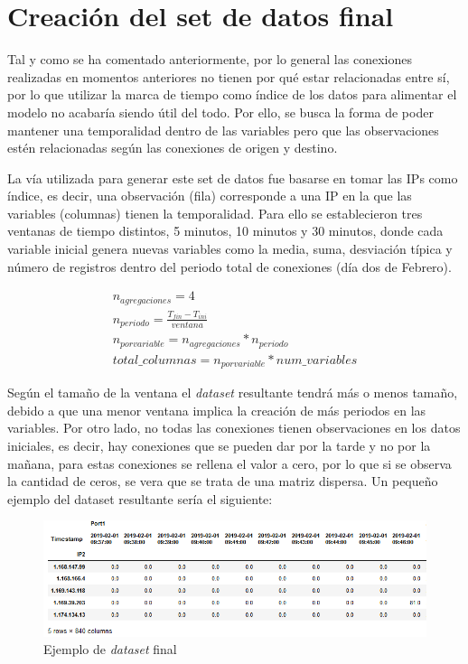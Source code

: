 \section{Creación del set de datos final}

Tal y como se ha comentado anteriormente, por lo general las conexiones realizadas en momentos anteriores no tienen por qué estar relacionadas entre sí, por lo que utilizar la marca de tiempo como índice de los datos para alimentar el modelo no acabaría siendo útil del todo. Por ello, se busca la forma de poder mantener una temporalidad dentro de las variables pero que las observaciones estén relacionadas según las conexiones de origen y destino.

La vía utilizada para generar este set de datos fue basarse en tomar las IPs como índice, es decir, una observación (fila) corresponde a una IP en la que las variables (columnas) tienen la temporalidad. Para ello se establecieron tres ventanas de tiempo distintos, 5 minutos, 10 minutos y 30 minutos, donde cada variable inicial genera nuevas variables como la media, suma, desviación típica y número de registros dentro del periodo total de conexiones (día dos de Febrero).

\begin{gather*}
n_{agregaciones} = 4 \\
n_{periodo} = \frac{T_{fin} - T_{ini}}{ventana} \\
n_{por variable} = n_{agregaciones} * n_{periodo} \\
total\_columnas = n_{por variable} * num\_variables
\end{gather*}

Según el tamaño de la ventana el \textit{dataset} resultante tendrá más o menos tamaño, debido a que una menor ventana implica la creación de más periodos en las variables. Por otro lado, no todas las conexiones tienen observaciones en los datos iniciales, es decir, hay conexiones que se pueden dar por la tarde y no por la mañana, para estas conexiones se rellena el valor a cero, por lo que si se observa la cantidad de ceros, se vera que se trata de una matriz dispersa. Un pequeño ejemplo del dataset resultante sería el siguiente:

\begin{figure}[h]
    \centering
    \includegraphics[width=16cm]{figs/dataset.PNG}
    \caption{Ejemplo de \textit{dataset} final}
    \label{fig:dataset}
\end{figure}

